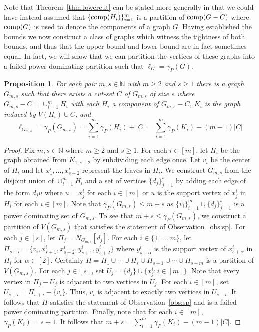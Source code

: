 \documentclass[11pt]{article}
\newcommand{\abs}[1]{\left\vert#1\right\vert}
\newtheorem{proposition}{Proposition}
\begin{document}
Note that Theorem~\ref{thm:lowercut} can be stated more generally in that we could have instead assumed that $\{{\rm{comp}}(H_i)\}_{i=1}^m$ is a partition of ${\rm{comp}}(G-C)$ where ${\rm{comp}}(G)$ is used to denote the components of a graph $G$. Having established the bounds we now construct a class of graphs which witness the tightness of both bounds, and thus that the upper bound and lower bound are in fact sometimes equal. In fact, we will show that we can partition the vertices of these graphs into a failed power dominating partition such that $\ell_G = \gamma_P(G)$.

\begin{proposition}\label{constructcut1}
For each pair $m,s \in \mathbb N$ with $m \geq 2$ and $s \geq 1$ there is a graph $G_{m,s}$ such that there exists a cut-set $C$ of $G_{m,s}$ of size $s$ where $G_{m,s} - C =  \cup_{i=1}^m H_i$ with each $H_i$ a  component of $G_{m,s}-C$, $K_i$ is the graph induced by $V(H_i)\cup C$,  and 
\[\ell_{G_{m,s}} = \gamma_P(G_{m,s})=\sum_{i=1}^m \gamma_P(H_i)+\abs{C}=\sum_{i=1}^m \gamma_P(K_i)-(m-1)\abs{C}\]
\end{proposition}

\begin{proof}
Fix $m, s \in\mathbb{N}$ where $m \ge 2$ and $s \ge 1$. For each $i\in [m]$, let $H_i$ be the graph obtained from $K_{1, s+2}$ by subdividing each edge once. Let $v_i$ be the center of $H_i$ and let $x^i_1, \dots, x^i_{s+2}$ represent the leaves in $H_i$. We construct $G_{m,s}$ from the disjoint union of $\cup_{i=1}^mH_i$ and a set of vertices $\{d_j\}_{j=1}^s$ by adding each edge of the form $d_ju$ where $u = x^i_j$ for each $i \in [m]$ or $u$ is the support vertex of $x_j^i$ in $H_i$ for each $i\in [m]$. Note that $\gamma_P(G_{m, s}) \le m+s$ as $\{v_i\}_{i=1}^m \cup \{d_j\}_{j=1}^s$ is a power dominating set of $G_{m, s}$. To see that $m+s \le \gamma_P(G_{m, s})$, we construct a partition of $V(G_{m, s})$ that satisfies the statement of Observation~\ref{obs:sp}. For each $j \in [s]$, let $\Pi_j = N_{G_{m, s}}[d_j]$. For each $i \in \{1, \dots, m\}$, let $\Pi_{s+i} = \{v_i, x_{s+1}^i, x_{s+2}^i, y_{s+1}^i, y_{s+2}^i\}$ where $y_{s+\alpha}^i$ is the support vertex of $x_{s+\alpha}^i$ in $H_i$ for $\alpha\in[2]$. Certainly $\Pi = \Pi_1 \cup \cdots \cup \Pi_s \cup \Pi_{s+1}\cup \cdots \cup \Pi_{s+m}$ is a partition of $V(G_{m, s})$. For each $j \in [s]$, set $U_j = \{d_j\} \cup \{x_j^i: i \in [m]\}$. Note that every vertex in $\Pi_j - U_j$ is adjacent to two vertices in $U_j$. For each $i \in [m]$, set $U_{s+i} = \Pi_{s+i} - \{v_i\}$. Thus, $v_i$ is adjacent to exactly two vertices in $U_{s+i}$. It follows that $\Pi$ satisfies the statement of Observation~\ref{obs:sp} and is a failed power dominating partition.
Finally, note that for each $i\in [m]$, $\gamma_P(K_i) = s+1$. It follows that $m+s = \sum_{i=1}^m \gamma_P(K_i)-(m-1)\abs{C}$.
\end{proof}
\end{document}

